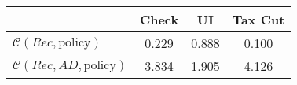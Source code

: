 \begin{tabular}{@{}lccc@{}} 
\toprule 
                          & Check      & UI    & Tax Cut    \\  \midrule 
$\mathcal{C}(Rec,\text{policy})$ & 0.229  & 0.888  & 0.100     \\ 
$\mathcal{C}(Rec, AD,\text{policy})$ & 3.834  & 1.905  & 4.126     \\ 
\end{tabular}  
